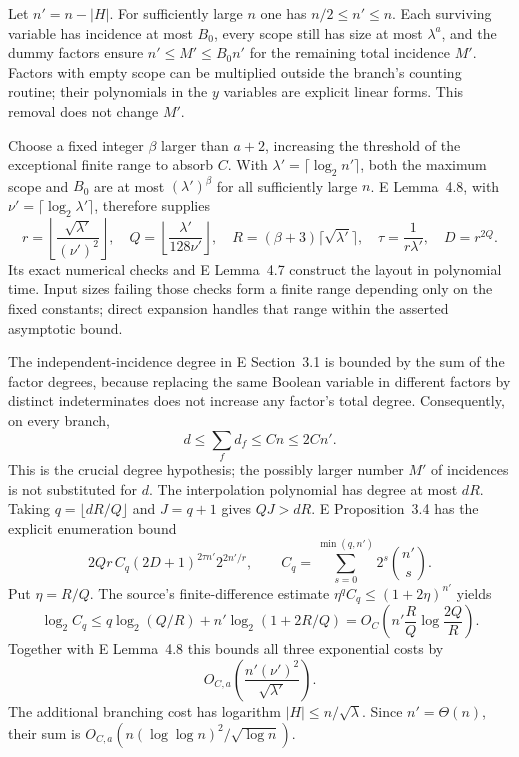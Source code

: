 Let $n'=n-|H|$.  For sufficiently large $n$ one has
$n/2\le n'\le n$.  Each surviving variable has incidence at
most $B_0$, every scope still has size at most $\lambda^a$,
and the dummy factors ensure $n'\le M'\le B_0n'$ for the
remaining total incidence $M'$.  Factors with empty scope
can be multiplied outside the branch's counting routine;
their polynomials in the $y$ variables are explicit linear
forms.  This removal does not change $M'$.

Choose a fixed integer $\beta$ larger than $a+2$, increasing
the threshold of the exceptional finite range to absorb
$C$.  With $\lambda'=\lceil\log_2 n'\rceil$, both the maximum
scope and $B_0$ are at most $(\lambda')^\beta$ for all
sufficiently large $n$.  E Lemma~4.8, with
$\nu'=\lceil\log_2\lambda'\rceil$, therefore supplies
\[
 r=\left\lfloor\frac{\sqrt{\lambda'}}{(\nu')^2}\right\rfloor,
 \quad Q=\left\lfloor\frac{\lambda'}{128\nu'}\right\rfloor,
 \quad R=(\beta+3)\lceil\sqrt{\lambda'}\rceil,
 \quad \tau=\frac1{r\lambda'},\quad D=r^{2Q}.
\]
Its exact numerical checks and E Lemma~4.7 construct the
layout in polynomial time.  Input sizes failing those
checks form a finite range depending only on the fixed
constants; direct expansion handles that range within
the asserted asymptotic bound.

The independent-incidence degree in E Section~3.1 is bounded
by the sum of the factor degrees, because replacing the
same Boolean variable in different factors by distinct
indeterminates does not increase any factor's total degree.
Consequently, on every branch,
\[
       d\le\sum_f d_f\le Cn\le 2Cn'.
\]
This is the crucial degree hypothesis; the possibly larger
number $M'$ of incidences is not substituted for $d$.
The interpolation polynomial has degree at most $dR$.
Taking $q=\lfloor dR/Q\rfloor$ and $J=q+1$ gives $QJ>dR$.
E Proposition~3.4 has the explicit enumeration bound
\[
       2Qr\,C_q(2D+1)^{2\tau n'}2^{2n'/r},\qquad
       C_q=\sum_{s=0}^{\min(q,n')}2^s\binom{n'}s.
\]
Put $\eta=R/Q$.  The source's finite-difference estimate
$\eta^qC_q\le(1+2\eta)^{n'}$ yields
\[
 \log_2 C_q
 \le q\log_2(Q/R)+n'\log_2(1+2R/Q)
 =O_C\!\left(n'\frac RQ\log\frac{2Q}{R}\right).
\]
Together with E Lemma~4.8 this bounds all three exponential
costs by
\[
 O_{C,a}\!\left(\frac{n'(\nu')^2}{\sqrt{\lambda'}}\right).
\]
The additional branching cost has logarithm
$|H|\le n/\sqrt\lambda$.  Since $n'=\Theta(n)$, their sum
is $O_{C,a}(n(\log\log n)^2/\sqrt{\log n})$.

